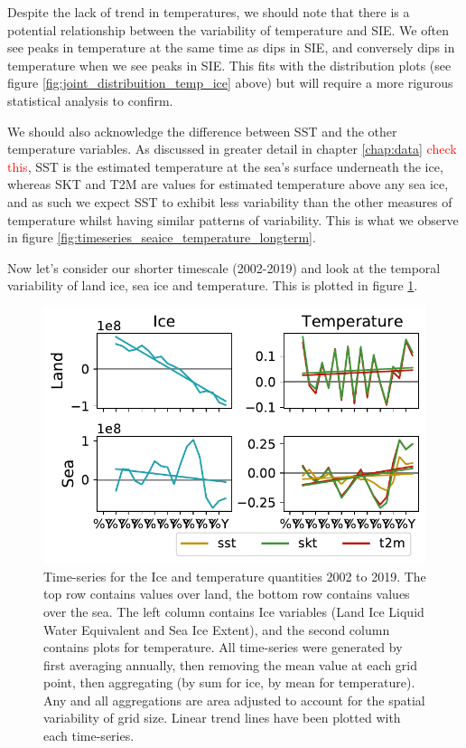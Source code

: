 \documentclass[../main.tex]{subfiles}
\begin{document}
Despite the lack of trend in temperatures, we should note that there is a potential relationship between the variability of temperature and SIE. We often see peaks in temperature at the same time as dips in SIE, and conversely dips in temperature when we see peaks in SIE. This fits with the distribution plots (see figure \ref{fig:joint_distribuition_temp_ice} above) but will require a more rigurous statistical analysis to confirm.

We should also acknowledge the difference between SST and the other temperature variables. As discussed in greater detail in chapter \ref{chap:data} \textcolor{red}{check this}, SST is the estimated temperature at the sea's surface underneath the ice, whereas SKT and T2M are values for estimated temperature above any sea ice, and as such we expect SST to exhibit less variability than the other measures of temperature whilst having similar patterns of variability. This is what we observe in figure \ref{fig:timeseries_seaice_temperature_longterm}. 

Now let's consider our shorter timescale (2002-2019) and look at the temporal variability of land ice, sea ice and temperature. This is plotted in figure \ref{fig:timeseries_seaice_temperature_shortterm}.
\begin{figure}[h!]
    \centering
    \includegraphics{images/week8/hres/six_timeseries}
    \caption{Time-series for the Ice and temperature quantities 2002 to 2019. The top row contains values over land, the bottom row contains values over the sea. The left column contains Ice variables (Land Ice Liquid Water Equivalent and Sea Ice Extent), and the second column contains plots for temperature. All time-series were generated by first averaging annually, then removing the mean value at each grid point, then aggregating (by sum for ice, by mean for temperature). Any and all aggregations are area adjusted to account for the spatial variability of grid size. Linear trend lines have been plotted with each time-series.}
    \label{fig:timeseries_seaice_temperature_shortterm}
\end{figure}
\end{document}
